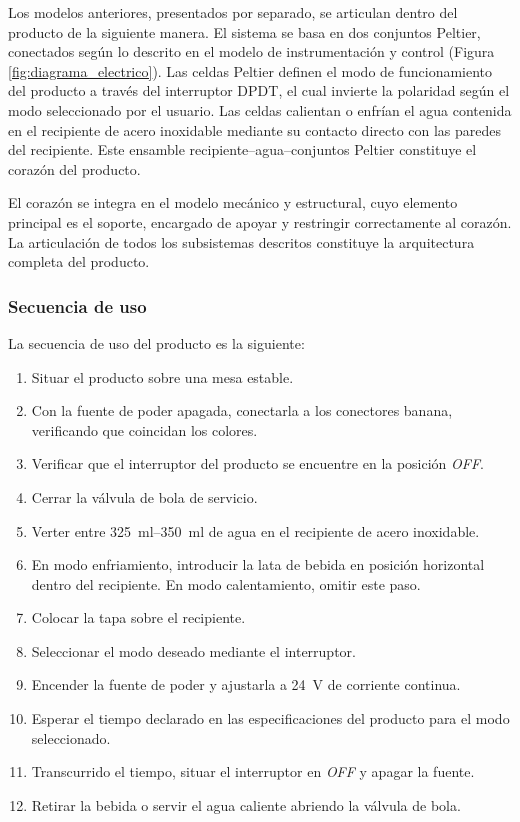 \documentclass[12pt, a4paper]{article}
\begin{document}
Los modelos anteriores, presentados por separado, se articulan dentro del producto de la siguiente manera. El sistema se basa en dos conjuntos Peltier, conectados según lo descrito en el modelo de instrumentación y control (Figura \ref{fig:diagrama_electrico}). Las celdas Peltier definen el modo de funcionamiento del producto a través del interruptor DPDT, el cual invierte la polaridad según el modo seleccionado por el usuario. Las celdas calientan o enfrían el agua contenida en el recipiente de acero inoxidable mediante su contacto directo con las paredes del recipiente. Este ensamble recipiente--agua--conjuntos Peltier constituye el corazón del producto.

El corazón se integra en el modelo mecánico y estructural, cuyo elemento principal es el soporte, encargado de apoyar y restringir correctamente al corazón. La articulación de todos los subsistemas descritos constituye la arquitectura completa del producto.

\subsubsection{Secuencia de uso}

La secuencia de uso del producto es la siguiente:

\begin{enumerate}
    \item Situar el producto sobre una mesa estable.
    \item Con la fuente de poder apagada, conectarla a los conectores banana, verificando que coincidan los colores.
    \item Verificar que el interruptor del producto se encuentre en la posición \textit{OFF}.
    \item Cerrar la válvula de bola de servicio.
    \item Verter entre \SIrange{325}{350}{\ml} de agua en el recipiente de acero inoxidable.
    \item En modo enfriamiento, introducir la lata de bebida en posición horizontal dentro del recipiente. En modo calentamiento, omitir este paso.
    \item Colocar la tapa sobre el recipiente.
    \item Seleccionar el modo deseado mediante el interruptor.
    \item Encender la fuente de poder y ajustarla a \SI{24}{\volt} de corriente continua.
    \item Esperar el tiempo declarado en las especificaciones del producto para el modo seleccionado.
    \item Transcurrido el tiempo, situar el interruptor en \textit{OFF} y apagar la fuente.
    \item Retirar la bebida o servir el agua caliente abriendo la válvula de bola.
\end{enumerate}
\end{document}
